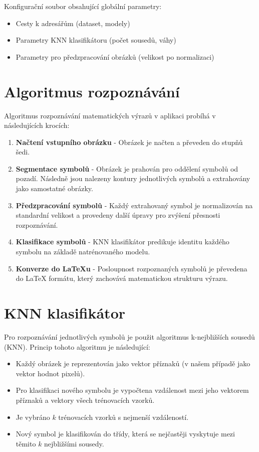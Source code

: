 \documentclass[12pt,a4paper]{article}
\begin{document}
Konfigurační soubor obsahující globální parametry:

\begin{itemize}
    \item Cesty k adresářům (dataset, modely)
    \item Parametry KNN klasifikátoru (počet sousedů, váhy)
    \item Parametry pro předzpracování obrázků (velikost po normalizaci)
\end{itemize}

\section{Algoritmus rozpoznávání}

Algoritmus rozpoznávání matematických výrazů v aplikaci probíhá v následujících krocích:

\begin{enumerate}
    \item \textbf{Načtení vstupního obrázku} - Obrázek je načten a převeden do stupňů šedi.
    
    \item \textbf{Segmentace symbolů} - Obrázek je prahován pro oddělení symbolů od pozadí. Následně jsou nalezeny kontury jednotlivých symbolů a extrahovány jako samostatné obrázky.
    
    \item \textbf{Předzpracování symbolů} - Každý extrahovaný symbol je normalizován na standardní velikost a provedeny další úpravy pro zvýšení přesnosti rozpoznávání.
    
    \item \textbf{Klasifikace symbolů} - KNN klasifikátor predikuje identitu každého symbolu na základě natrénovaného modelu.
    
    \item \textbf{Konverze do LaTeXu} - Posloupnost rozpoznaných symbolů je převedena do LaTeX formátu, který zachovává matematickou strukturu výrazu.
\end{enumerate}

\section{KNN klasifikátor}

Pro rozpoznávání jednotlivých symbolů je použit algoritmus k-nejbližších sousedů (KNN). Princip tohoto algoritmu je následující:

\begin{itemize}
    \item Každý obrázek je reprezentován jako vektor příznaků (v našem případě jako vektor hodnot pixelů).
    \item Pro klasifikaci nového symbolu je vypočtena vzdálenost mezi jeho vektorem příznaků a vektory všech trénovacích vzorků.
    \item Je vybráno $k$ trénovacích vzorků s nejmenší vzdáleností.
    \item Nový symbol je klasifikován do třídy, která se nejčastěji vyskytuje mezi těmito $k$ nejbližšími sousedy.
\end{itemize}
\end{document}
